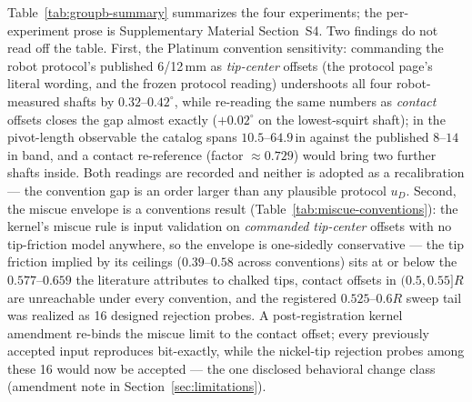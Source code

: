 Table~\ref{tab:groupb-summary} summarizes the four experiments; the
per-experiment prose is Supplementary Material Section~S4. Two findings
do not read off the table. First, the Platinum convention sensitivity:
commanding the robot protocol's published 6/12\,mm as \emph{tip-center}
offsets (the protocol page's literal wording, and the frozen 
protocol reading) undershoots all four robot-measured shafts by
$0.32$--$0.42^\circ$, while re-reading the same numbers as \emph{contact}
offsets closes the gap almost exactly ($+0.02^\circ$ on the lowest-squirt
shaft); in the pivot-length observable the catalog spans
$10.5$--$64.9$\,in against the published $8$--$14$\,in band, and a
contact re-reference (factor $\approx 0.729$) would bring two further
shafts inside. Both readings are recorded and neither is adopted as a
recalibration --- the convention gap is an order larger than any
plausible protocol $u_D$. Second,
the miscue envelope is a conventions result
(Table~\ref{tab:miscue-conventions}): the kernel's miscue rule is input
validation on \emph{commanded tip-center} offsets with no tip-friction
model anywhere, so the envelope is one-sidedly conservative --- the tip
friction implied by its ceilings ($0.39$--$0.58$ across conventions)
sits at or below the $0.577$--$0.659$ the literature attributes to
chalked tips, contact offsets in $(0.5, 0.55]R$ are unreachable under
every convention, and the registered $0.525$--$0.6R$ sweep tail was
realized as 16 designed rejection probes. A post-registration kernel amendment
re-binds the miscue limit to the contact offset; every previously
accepted input reproduces bit-exactly, while the nickel-tip rejection
probes among these 16 would now be accepted --- the one disclosed
behavioral change class (amendment note in
Section~\ref{sec:limitations}).

